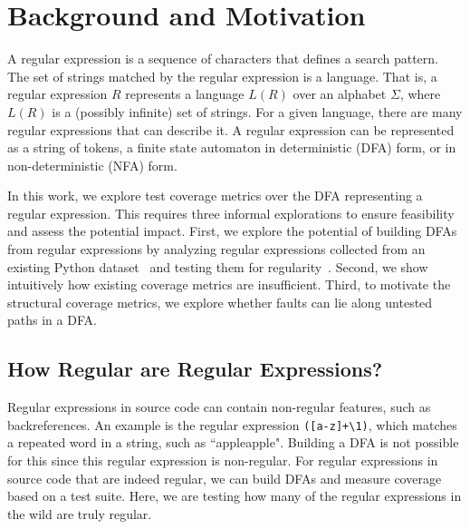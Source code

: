 

\section{Background and Motivation}
\label{sec:motive}
A regular expression is a sequence of characters that defines a search pattern. 
The set of strings matched by the regular expression is a language. 
That is, a regular expression $R$ represents a language $L(R)$ over an alphabet $\Sigma$, where $L(R)$ is a (possibly infinite) set of strings. 
For a given language, there are many regular expressions that can describe it. 
A regular expression can be represented as a string of tokens, a finite state automaton in deterministic (DFA) form, or in non-deterministic (NFA) form.%


In this work, we explore test coverage metrics over the DFA representing a regular expression. This requires three informal explorations to ensure feasibility and assess the potential impact. 
First, we explore the potential of building DFAs from regular expressions by analyzing regular expressions collected from an existing Python dataset~\cite{chapman2016} and testing them for regularity~\cite{sipser2006introduction}.
Second, we show intuitively how existing coverage metrics are insufficient. 
Third, to motivate the structural coverage metrics, we explore whether faults can lie along untested paths in a DFA. 



\subsection{How Regular are Regular Expressions?}
\label{regularregularexpressions}
Regular expressions in source code can contain non-regular features, such as backreferences. An example is the regular expression \verb!([a-z]+\1)!, which matches a repeated word in a string, such as ``appleapple". Building a DFA is not possible for this since this regular expression is non-regular. For regular expressions in source code that are indeed regular, we can build DFAs and measure coverage based on a test suite. 
Here, we are testing how many of the regular expressions in the wild are truly regular. 

